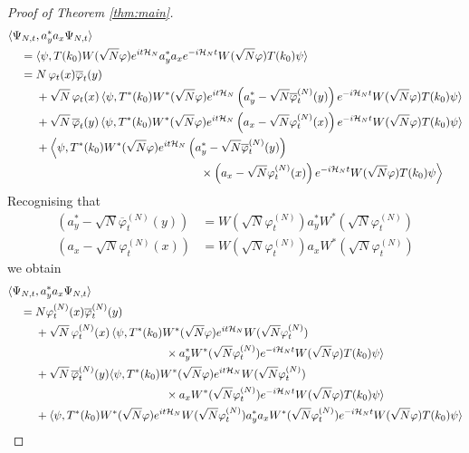 \documentclass[11pt,a4paper]{article}
\newcommand{\cH}{{\cal H}}
\begin{document}
\begin{proof}[Proof of Theorem \ref{thm:main}]
\[\begin{split}
\langle \Psi_{N,t}  &, a_y^* a_x \Psi_{N,t} \rangle \\ = \;  & \langle \psi, T(k_0) W (\sqrt{N} \varphi) e^{it \cH_N} a_y^* a_x e^{-i\cH_N t} W(\sqrt{N} \varphi) T(k_0) \psi \rangle \\  = \; & N \, \varphi_t (x) \overline{\varphi}_t (y) \\ &+  \sqrt{N} \, \varphi_t (x) \, \langle \psi, T^* (k_0) W^* (\sqrt{N} \varphi) e^{it \cH_N} \left(a_y^* - \sqrt{N} \overline{\varphi}^{(N)}_t (y)\right) e^{-i\cH_N t} W(\sqrt{N} \varphi) T(k_0) \psi \rangle \\  &+ \sqrt{N} \, \overline{\varphi}_t (y) \,  \langle \psi, T^* (k_0) W^* (\sqrt{N} \varphi) e^{it \cH_N} \left(a_x - \sqrt{N} \varphi^{(N)}_t (x) \right) e^{-i\cH_N t} W(\sqrt{N} \varphi) T(k_0) \psi \rangle \\ &+ \Big\langle \psi , T^* (k_0) W^* (\sqrt{N} \varphi) e^{it \cH_N} \left(a_y^* -\sqrt{N} \overline{\varphi}_t^{(N)} (y)\right) \\ &\hspace{5cm} \times \left(a_x - \sqrt{N} \varphi^{(N)}_t (x) \right) e^{-i\cH_N t} W(\sqrt{N} \varphi) T(k_0) \psi \Big\rangle \end{split}\]
Recognising that
\[ \begin{split} (a_y^* - \sqrt{N} \overline{\varphi}^{(N)}_t (y)) &= W (\sqrt{N} \varphi^{(N)}_t) a_y^* W^* (\sqrt{N} \varphi_t^{(N)}) \\ (a_x - \sqrt{N} \varphi^{(N)}_t (x)) &= W (\sqrt{N} \varphi^{(N)}_t) a_x W^* (\sqrt{N} \varphi_t^{(N)}) \end{split} \]
we obtain
\[ \begin{split} \langle \Psi_{N,t} &, a_y^* a_x \Psi_{N,t} \rangle \\ = \; &N \varphi_t^{(N)} (x) \overline{\varphi}_t^{(N)} (y) \\ &+ \sqrt{N} \, \varphi^{(N)}_t (x) \, \langle \psi, T^* (k_0) W^* (\sqrt{N} \varphi) e^{it \cH_N} W (\sqrt{N} \varphi^{(N)}_t) \\ &\hspace{4cm} \times a_y^* W^* (\sqrt{N} \varphi^{(N)}_t) e^{-i\cH_N t} W(\sqrt{N} \varphi) T(k_0) \psi \rangle \\  &+ \sqrt{N} \, \overline{\varphi}^{(N)}_t (y)  \langle \psi, T^* (k_0) W^* (\sqrt{N} \varphi) e^{it \cH_N} W (\sqrt{N} \varphi^{(N)}_t) \\ &\hspace{4cm} \times a_x W^* (\sqrt{N} \varphi^{(N)}_t) e^{-i\cH_N t} W(\sqrt{N} \varphi) T(k_0) \psi \rangle \\ &+ \langle \psi , T^* (k_0) W^* (\sqrt{N} \varphi) e^{it \cH_N} W (\sqrt{N} \varphi^{(N)}_t) a_y^* a_x W^* (\sqrt{N} \varphi^{(N)}_t)  e^{-i\cH_N t} W(\sqrt{N} \varphi) T(k_0) \psi \rangle \end{split}\]

\end{proof}
\end{document}
